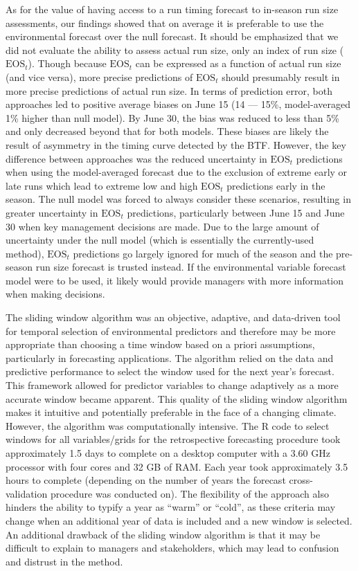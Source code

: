 \documentclass[12pt,]{book}
\theoremstyle{definition}
\theoremstyle{definition}
\theoremstyle{definition}
\theoremstyle{remark}
\begin{document}
As for the value of having access to a run timing forecast to in-season
run size assessments, our findings showed that on average it is
preferable to use the environmental forecast over the null forecast. It
should be emphasized that we did not evaluate the ability to assess
actual run size, only an index of run size (\(\text{EOS}_t\)). Though
because \(\text{EOS}_t\) can be expressed as a function of actual run
size (and vice versa), more precise predictions of \(\text{EOS}_t\)
should presumably result in more precise predictions of actual run size.
In terms of prediction error, both approaches led to positive average
biases on June 15 (14 --- 15\%, model-averaged 1\% higher than null
model). By June 30, the bias was reduced to less than 5\% and only
decreased beyond that for both models. These biases are likely the
result of asymmetry in the timing curve detected by the BTF. However,
the key difference between approaches was the reduced uncertainty in
\(\text{EOS}_t\) predictions when using the model-averaged forecast due
to the exclusion of extreme early or late runs which lead to extreme low
and high \(\text{EOS}_t\) predictions early in the season. The null
model was forced to always consider these scenarios, resulting in
greater uncertainty in \(\text{EOS}_t\) predictions, particularly
between June 15 and June 30 when key management decisions are made. Due
to the large amount of uncertainty under the null model (which is
essentially the currently-used method), \(\text{EOS}_t\) predictions go
largely ignored for much of the season and the pre-season run size
forecast is trusted instead. If the environmental variable forecast
model were to be used, it likely would provide managers with more
information when making decisions.

The sliding window algorithm was an objective, adaptive, and data-driven
tool for temporal selection of environmental predictors and therefore
may be more appropriate than choosing a time window based on a priori
assumptions, particularly in forecasting applications. The algorithm
relied on the data and predictive performance to select the window used
for the next year's forecast. This framework allowed for predictor
variables to change adaptively as a more accurate window became
apparent. This quality of the sliding window algorithm makes it
intuitive and potentially preferable in the face of a changing climate.
However, the algorithm was computationally intensive. The R code to
select windows for all variables/grids for the retrospective forecasting
procedure took approximately 1.5 days to complete on a desktop computer
with a 3.60 GHz processor with four cores and 32 GB of RAM. Each year
took approximately 3.5 hours to complete (depending on the number of
years the forecast cross-validation procedure was conducted on). The
flexibility of the approach also hinders the ability to typify a year as
``warm'' or ``cold'', as these criteria may change when an additional
year of data is included and a new window is selected. An additional
drawback of the sliding window algorithm is that it may be difficult to
explain to managers and stakeholders, which may lead to confusion and
distrust in the method.
\end{document}
